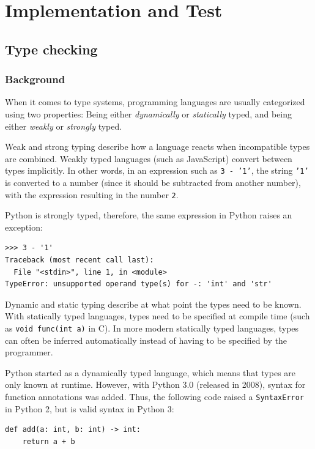 \documentclass[a4paper,parskip=full]{scrreprt}
\newcommand{\js}[1]{\texttt{#1}}
\begin{document}
\chapter{Implementation and Test}
\label{ch:implementation}

\section{Type checking}
\subsection{Background}
When it comes to type systems, programming languages are usually categorized
using two properties: Being either \emph{dynamically} or \emph{statically}
typed, and being either \emph{weakly} or \emph{strongly} typed.

Weak and strong typing describe how a language reacts when incompatible types
are combined. Weakly typed languages (such as JavaScript) convert between types
implicitly. In other words, in an expression such as
\js{3 - '1'}, the string \js{'1'} is converted to a number (since it should be
subtracted from another number), with the expression resulting in the number
\js{2}.

Python is strongly typed, therefore, the same expression in Python raises an
exception:

\begin{verbatim}
>​>​> 3 - '1'
Traceback (most recent call last):
  File "<stdin>", line 1, in <module>
TypeError: unsupported operand type(s) for -: 'int' and 'str'
\end{verbatim}

Dynamic and static typing describe at what point the types need to be known.
With statically typed languages, types need to be specified at compile time
(such as \texttt{void func(int a)} in C). In more modern statically typed
languages, types can often be inferred automatically instead of having to be
specified by the programmer.

Python started as a dynamically typed language, which means that types are only
known at runtime. However, with Python 3.0 (released in 2008), syntax for
function annotations was added. Thus, the following code raised a
\verb|SyntaxError| in Python 2, but is valid syntax in Python 3:

\begin{verbatim}
def add(a: int, b: int) -> int:
    return a + b
\end{verbatim}
\end{document}
